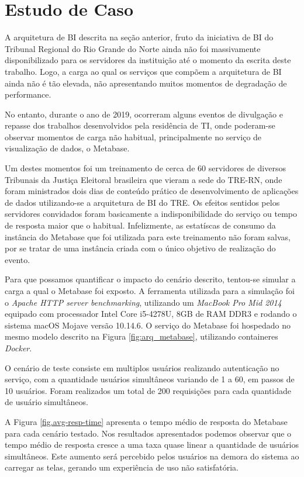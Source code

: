 \section{Estudo de Caso}

A arquitetura de BI descrita na seção anterior, fruto da iniciativa de BI do Tribunal Regional do Rio Grande do Norte ainda não foi massivamente disponibilizado para os servidores da instituição até o momento da escrita deste trabalho. Logo, a carga ao qual os serviços que compõem a arquitetura de BI ainda não é tão elevada, não apresentando muitos momentos de degradação de performance.

No entanto, durante o ano de 2019, ocorreram alguns eventos de divulgação e repasse dos trabalhos desenvolvidos pela residência de TI, onde poderam-se observar momentos de carga não habitual, principalmente no serviço de visualização de dados, o Metabase.

Um destes momentos foi um treinamento de cerca de 60 servidores de diversos Tribunais da Justiça Eleitoral brasileira que vieram a sede do TRE-RN, onde foram ministrados dois dias de conteúdo prático de desenvolvimento de aplicações de dados utilizando-se a arquitetura de BI do TRE. Os efeitos sentidos pelos servidores convidados foram basicamente a indisponibilidade do serviço ou tempo de resposta maior que o habitual. Infelizmente, as estatíscas de consumo da instância do Metabase que foi utilizada para este treinamento não foram salvas, por se tratar de uma instância criada com o único objetivo de realização do evento. 

Para que possamos quantificar o impacto do cenário descrito, tentou-se simular a carga a qual o Metabase foi exposto. A ferramenta utilizada para a simulação foi o \textit{Apache HTTP server benchmarking}, utilizando um \textit{MacBook Pro Mid 2014} equipado com processador Intel Core i5-4278U, 8GB de RAM DDR3 e rodando o sistema macOS Mojave versão 10.14.6. O serviço do Metabase foi hospedado no mesmo modelo descrito na Figura \ref{fig:arq_metabase}, utilizando containeres \textit{Docker}. 

O cenário de teste consiste em multiplos usuários realizando autenticação no serviço, com a quantidade usuários simultâneos variando de 1 a 60, em passos de 10 usuários. Foram realizados um total de 200 requisições para cada quantidade de usuário simultâneos. 

A Figura \ref{fig.avg-resp-time} apresenta o tempo médio de resposta do Metabase para cada cenário testado. Nos resultados apresentados podemos observar que o tempo médio de resposta cresce a uma taxa quase linear a quantidade de usuários simultâneos. Este aumento será percebido pelos usuários na demora do sistema ao carregar as telas, gerando um experiência de uso não satisfatória. 

